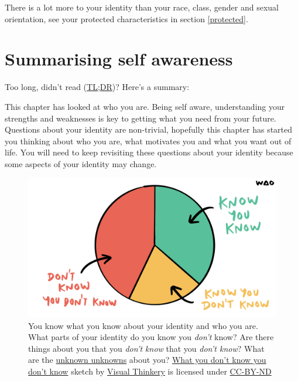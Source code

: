 \documentclass[
]{book}
\begin{document}
There is a lot more to your identity than your race, class, gender and sexual orientation, see your protected characteristics in section \ref{protected}.

\hypertarget{tldr2}{%
\section{Summarising self awareness}\label{tldr2}}

Too long, didn't read (\href{https://en.wiktionary.org/wiki/too_long;_didn\%27t_read}{TL;DR})? Here's a summary:

This chapter has looked at who you are. Being self aware, understanding your strengths and weaknesses is key to getting what you need from your future. Questions about your identity are non-trivial, hopefully this chapter has started you thinking about who you are, what motivates you and what you want out of life. You will need to keep revisiting these questions about your identity because some aspects of your identity may change.

\begin{figure}

{\centering \includegraphics[width=1\linewidth]{images/you-dont-know-you-dont-know} 

}

\caption{You know what you know about your identity and who you are. What parts of your identity do you know you \emph{don't} know? Are there things about you that you \emph{don't know} that you \emph{don't know}? What are the \href{https://en.wikipedia.org/wiki/There_are_known_knowns}{unknown unknowns} about you? \href{https://bryanmmathers.com/what-you-dont-know-you-dont-know}{What you don't know you don't know} sketch by \href{https://visualthinkery.com/}{Visual Thinkery} is licensed under \href{https://creativecommons.org/licenses/by-nd/4.0/}{CC-BY-ND}}\label{fig:mathers-known-fig}
\end{figure}
\end{document}
